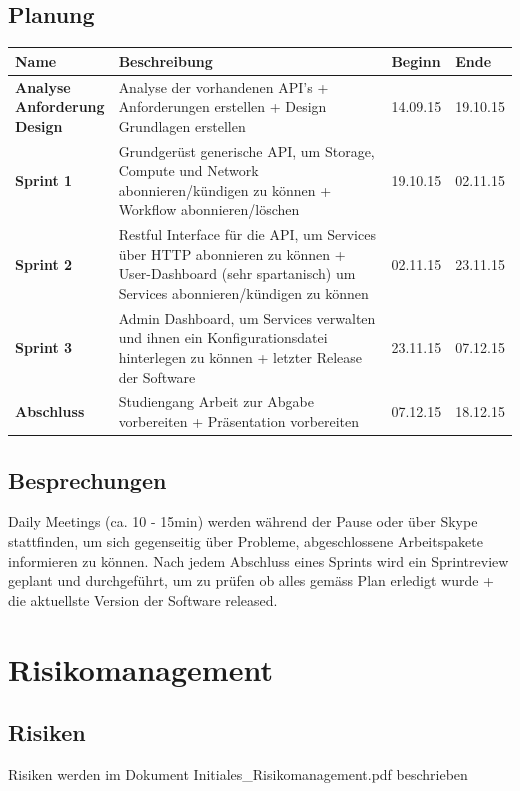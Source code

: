 \documentclass[11pt]{scrartcl}
\begin{document}
\subsection{Planung}
\begin{tabularx}{\textwidth}{l X l l}
\textbf{Name} & \textbf{Beschreibung} & \textbf{Beginn} &  \textbf{Ende} \\
\hline
\pbox{3cm}{
\textbf{Analyse}
\\
\textbf{Anforderung}
\\
\textbf{Design} 
}& Analyse der vorhandenen API's + Anforderungen 
erstellen + Design Grundlagen erstellen & 14.09.15 & 19.10.15\\
\hline
\textbf{Sprint 1} & Grundgerüst generische API, um Storage, Compute und Network 
abonnieren/kündigen zu können
+ Workflow abonnieren/löschen  & 19.10.15 & 02.11.15 \\
\hline
\textbf{Sprint 2} & Restful Interface für die API, um Services über HTTP 
abonnieren zu können + User-Dashboard (sehr spartanisch)  um Services 
abonnieren/kündigen zu können
& 02.11.15 & 23.11.15 \\
\hline
\textbf{Sprint 3} & Admin Dashboard, um Services verwalten 
und ihnen ein Konfigurationsdatei hinterlegen zu können + letzter Release der Software & 23.11.15 & 07.12.15 \\
\hline
\textbf{Abschluss} & Studiengang Arbeit zur Abgabe vorbereiten + Präsentation 
vorbereiten & 07.12.15 & 18.12.15\\
\end{tabularx}

\subsection{Besprechungen}
Daily Meetings (ca. 10 - 15min) werden während der Pause oder über Skype stattfinden, um sich 
gegenseitig über Probleme, abgeschlossene Arbeitspakete informieren zu können.
Nach jedem Abschluss eines Sprints wird ein Sprintreview geplant und durchgeführt, um zu prüfen 
ob alles gemäss Plan erledigt wurde + die aktuellste Version der Software 
released.
\section{Risikomanagement}
\subsection{Risiken}
Risiken werden im Dokument Initiales\_Risikomanagement.pdf beschrieben
\end{document}
